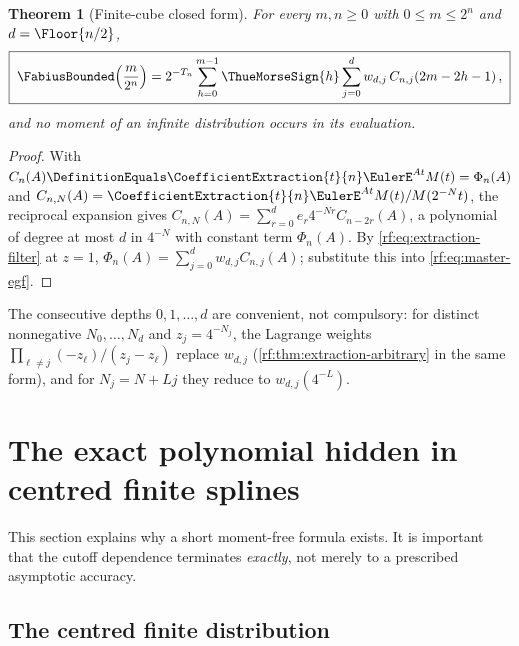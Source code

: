 \documentclass[11pt,oneside]{article}
\theoremstyle{plain}
\newtheorem{theorem}{Theorem}[section]
\theoremstyle{definition}
\theoremstyle{remark}
\newcommand{\Fb}{\FabiusBounded}            %
\newcommand{\tm}[1]{\ThueMorseSign{#1}}     %
\newcommand{\coeff}[2]{\CoefficientExtraction{#1}{#2}}
\newcommand{\Tr}[1]{T_{#1}}                 %
\begin{document}
\begin{theorem}[Finite-cube closed form]
\label{rf:thm:finite-cube}
For every $m,n\ge0$ with $0\le m\le2^{n}$ and $d=\Floor{n/2}$,
\begin{equation}
 \boxed{\;
 \Fb\!\left(\frac{m}{2^{n}}\right)
 =2^{-\Tr{n}}\sum_{h=0}^{m-1}\tm{h}\sum_{j=0}^{d}w_{d,j}\,C_{n,j}(2m-2h-1)\,,\;}
 \label{rf:eq:finite-cube}
\end{equation}
and no moment of an infinite distribution occurs in its evaluation.
\end{theorem}

\begin{proof}
With $C_{n}(A)\DefinitionEquals\coeff{t}{n}\EulerE^{At}M(t)=\Phi_{n}(A)$ and
$C_{n,N}(A)=\coeff{t}{n}\EulerE^{At}M(t)/M(2^{-N}t)$, the reciprocal
expansion gives $C_{n,N}(A)=\sum_{r=0}^{d}e_{r}4^{-Nr}C_{n-2r}(A)$, a
polynomial of degree at most $d$ in $4^{-N}$ with constant term
$\Phi_{n}(A)$.  By \cref{rf:eq:extraction-filter} at $z=1$,
$\Phi_{n}(A)=\sum_{j=0}^{d}w_{d,j}C_{n,j}(A)$; substitute this into
\cref{rf:eq:master-egf}.
\end{proof}

The consecutive depths $0,1,\ldots,d$ are convenient, not compulsory: for
distinct nonnegative $N_{0},\ldots,N_{d}$ and $z_{j}=4^{-N_{j}}$, the
Lagrange weights $\prod_{\ell\neq j}(-z_{\ell})/(z_{j}-z_{\ell})$ replace
$w_{d,j}$ (\cref{rf:thm:extraction-arbitrary} in the same form), and for
$N_{j}=N+Lj$ they reduce to $w_{d,j}(4^{-L})$.

\section{The exact polynomial hidden in centred finite splines}
\label{rf:sec:splines}

This section explains why a short moment-free formula exists.  It is
important that the cutoff dependence terminates \emph{exactly}, not merely
to a prescribed asymptotic accuracy.

\subsection{The centred finite distribution}
\label{rf:sec:splines-centred}
\end{document}
